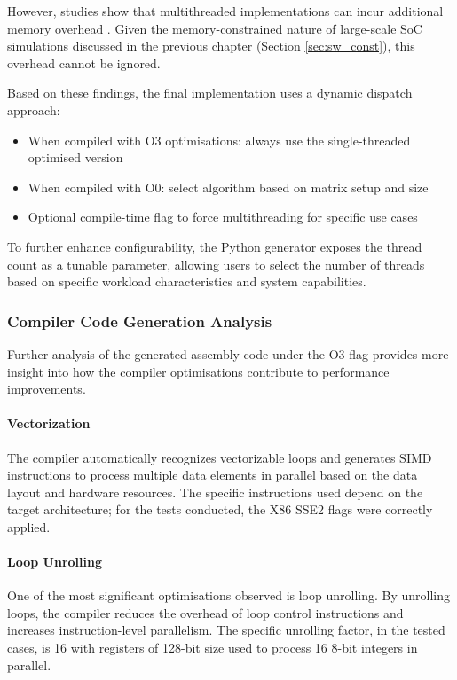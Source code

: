 However, studies show that multithreaded implementations can incur additional memory overhead \cite{tang_multithreaded_2024}.
Given the memory-constrained nature of large-scale SoC simulations discussed in the previous chapter (Section \ref{sec:sw_const}), this overhead cannot be ignored.

Based on these findings, the final implementation uses a dynamic dispatch approach:
\begin{itemize}
    \item When compiled with O3 optimisations: always use the single-threaded optimised version
    \item When compiled with O0: select algorithm based on matrix setup and size
    \item Optional compile-time flag to force multithreading for specific use cases
\end{itemize}

To further enhance configurability, the Python generator exposes the thread count as a tunable parameter, allowing users to select the number of threads based on specific workload characteristics and system capabilities.

\subsubsection{Compiler Code Generation Analysis}\label{sec:codegen_analysis}
Further analysis of the generated assembly code under the O3 flag provides more insight into how the compiler optimisations contribute to performance improvements.

\paragraph{Vectorization} The compiler automatically recognizes vectorizable loops and generates SIMD instructions to process multiple data elements in parallel based on the data layout and hardware resources.
The specific instructions used depend on the target architecture; for the tests conducted, the X86 SSE2 flags were correctly applied.

\paragraph{Loop Unrolling} One of the most significant optimisations observed is loop unrolling.
By unrolling loops, the compiler reduces the overhead of loop control instructions and increases instruction-level parallelism.
The specific unrolling factor, in the tested cases, is 16 with registers of 128-bit size used to process 16 8-bit integers in parallel.
